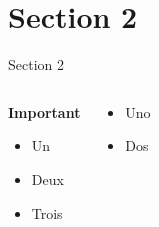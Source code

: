 \documentclass[usenames,dvipsnames, 8pt]{beamer}
\begin{document}
\section{Section 2} %
\begin{frame}{Section 2} %
\begin{columns}[T] %
    \begin{alertblock}{\textbf{Important}}
    \begin{itemize}
        \item Un
        \item Deux
        \item Trois
    \end{itemize}
    \end{alertblock}
\begin{example}
    \begin{itemize}
        \item Uno
        \item Dos
    \end{itemize}
\end{example}
\end{columns}
\end{frame}
\end{document}
